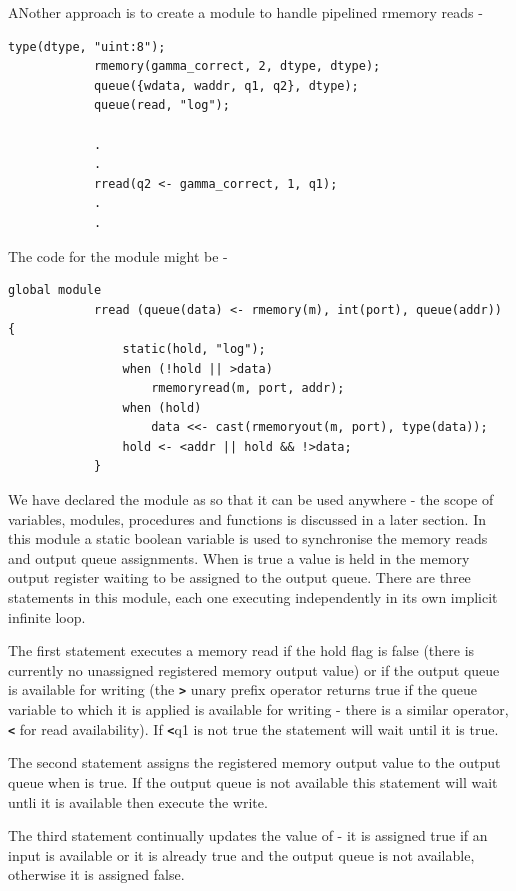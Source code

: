         ANother approach is to create a module to handle pipelined
        rmemory reads -
        \begin{lstlisting}[language=threepl]
            type(dtype, "uint:8");
            rmemory(gamma_correct, 2, dtype, dtype);
            queue({wdata, waddr, q1, q2}, dtype);
            queue(read, "log");

            .
            .
            rread(q2 <- gamma_correct, 1, q1);
            .
            .
        \end{lstlisting}
        The code for the module might be -
        \begin{lstlisting}[language=threepl]
            global module
            rread (queue(data) <- rmemory(m), int(port), queue(addr)) {
                static(hold, "log");
                when (!hold || >data)
                    rmemoryread(m, port, addr);
                when (hold)
                    data <<- cast(rmemoryout(m, port), type(data));
                hold <- <addr || hold && !>data;
            }
        \end{lstlisting}
        We have declared the module as  so that it can be used anywhere -
        the scope of variables, modules, procedures and functions is discussed in
        a later section. In this module a static boolean variable  is used
        to synchronise the memory reads and output queue assignments. When 
        is true a value is held in the memory output register waiting to be assigned
        to the output queue. There are three statements in this module, each one
        executing independently in its own implicit infinite loop.

        The first statement executes a memory read if the hold flag is false (there
        is currently no unassigned registered memory output value) or if the output
        queue is available for writing (the {\bf \verb'>'} unary prefix operator returns
        true if the queue variable to which it is applied is available for writing -
        there is a similar operator, {\bf \verb'<'} for read availability). If
        {\bf \verb'<'}q1 is not true the statement will wait until it is true.

        The second statement assigns the registered memory output value to the output
        queue when  is true. If the output queue  is not available
        this statement will wait untli it is available then execute the write.

        The third statement continually updates the value of  - it is
        assigned true if an input is available or it is already true and the output
        queue is not available, otherwise it is assigned false.

